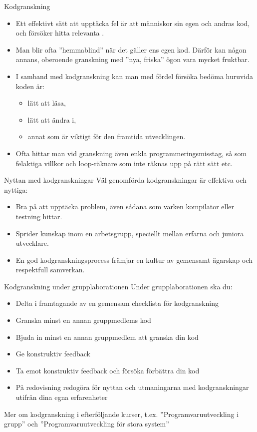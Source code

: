 

\begin{Slide}{Kodgranskning}
\begin{itemize}
\item Ett effektivt sätt att upptäcka fel är att människor  sin egen och andras kod, och försöker hitta relevanta . 
\item Man blir ofta ''hemmablind'' när det gäller ens egen kod. Därför kan någon annans, oberoende granskning med ''nya, friska'' ögon vara mycket fruktbar. 
\item I samband med kodgranskning kan man med fördel försöka bedöma  huruvida koden är:
\begin{itemize}
\item lätt att läsa, 
\item lätt att ändra i,  
\item annat som är viktigt för den framtida utvecklingen.
\end{itemize}
\item Ofta hittar man vid granskning även enkla programmeringsmisstag, så som felaktiga villkor och loop-räknare som inte räknas upp på rätt sätt etc.
\end{itemize}
\end{Slide}

\begin{Slide}{Nyttan med kodgranskningar}
Väl genomförda kodgranskningar är effektiva och nyttiga:
\begin{itemize}
\item Bra på att upptäcka problem, även sådana som varken kompilator eller testning hittar.
\item Sprider kunskap inom en arbetsgrupp, speciellt mellan erfarna och juniora utvecklare.
\item En god kodgranskningsprocess främjar en kultur av gemensamt ägarskap och respektfull samverkan.
\end{itemize}
\end{Slide}


\begin{Slide}{Kodgranskning under grupplaborationen}
Under grupplaborationen ska du:
\begin{itemize}
\item Delta i framtagande av en gemensam checklista för kodgranskning
\item Granska minst en annan gruppmedlems kod 
\item Bjuda in minst en annan gruppmedlem att granska din kod
\item Ge konstruktiv feedback
\item Ta emot konstruktiv feedback och försöka förbättra din kod
\item På redovisning redogöra för nyttan och utmaningarna med kodgranskningar utifrån dina egna erfarenheter
\end{itemize}
Mer om kodgranskning i efterföljande kurser, t.ex. ''Programvaruutveckling i grupp'' och ''Programvaruutveckling för stora system''
\end{Slide}
